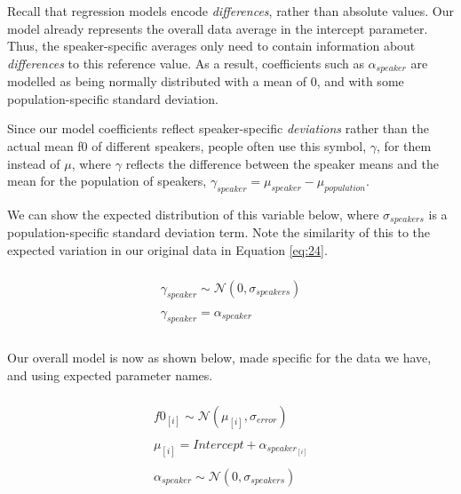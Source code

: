 \documentclass[
]{book}
\begin{document}
Recall that regression models encode \emph{differences}, rather than absolute values. Our model already represents the overall data average in the intercept parameter. Thus, the speaker-specific averages only need to contain information about \emph{differences} to this reference value. As a result, coefficients such as \(\alpha_{speaker}\) are modelled as being normally distributed with a mean of 0, and with some population-specific standard deviation.

Since our model coefficients reflect speaker-specific \emph{deviations} rather than the actual mean f0 of different speakers, people often use this symbol, \(\gamma\), for them instead of \(\mu\), where \(\gamma\) reflects the difference between the speaker means and the mean for the population of speakers, \(\gamma_{speaker} = \mu_{speaker} - \mu_{population}\).

We can show the expected distribution of this variable below, where \(\sigma_{speakers}\) is a population-specific standard deviation term. Note the similarity of this to the expected variation in our original data in Equation \eqref{eq:24}.

\begin{equation}
\begin{split}
\\
\gamma_{speaker} \sim \mathcal{N}(0,\sigma_{speakers}) \\ \\ 
\gamma_{speaker} = \alpha_{speaker} \\ \\
\end{split}
\label{eq:27}
\end{equation}

Our overall model is now as shown below, made specific for the data we have, and using expected parameter names.

\begin{equation}
\begin{split}
\\
f0_{[i]} \sim \mathcal{N}(\mu_{[i]},\sigma_{error}) \\ \\
\mu_{[i]} = Intercept + \alpha_{speaker_{[i]}} \\ \\
\alpha_{speaker} \sim \mathcal{N}(0,\sigma_{speakers}) \\ \\
\end{split}
\label{eq:28}
\end{equation}
\end{document}
